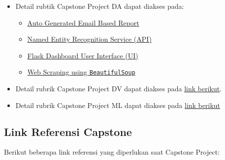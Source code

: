 \documentclass[
]{book}
\providecommand{\tightlist}{%
  \setlength{\itemsep}{0pt}\setlength{\parskip}{0pt}}
\begin{document}
\begin{itemize}
\tightlist
\item
  Detail rubtik Capstone Project DA dapat diakses pada:

  \begin{itemize}
  \tightlist
  \item
    \href{https://github.com/ttnsy/fire-capstone}{Auto Generated Email Based Report}
  \item
    \href{https://github.com/iqbalbasyar/ner-flask}{Named Entity Recognition Service (API)}
  \item
    \href{https://github.com/fafilia/capstone-UIFlask}{Flask Dashboard User Interface (UI)}
  \item
    \href{https://github.com/t3981-h/BeautifulSoup-Capstone}{Web Scraping using \texttt{BeautifulSoup}}
  \end{itemize}
\item
  Detail rubrik Capstone Project DV dapat diakses pada \href{https://rpubs.com/AlgoritmaAcademy/dv-capstone}{link berikut}.
\item
  Detail rubrik Capstone Project ML dapat diakses pada \href{https://rpubs.com/AlgoritmaAcademy/ml-capstone}{link berikut}
\end{itemize}

\hypertarget{link-referensi-capstone}{%
\subsection{Link Referensi Capstone}\label{link-referensi-capstone}}

Berikut beberapa link referensi yang diperlukan saat Capstone Project:
\end{document}
